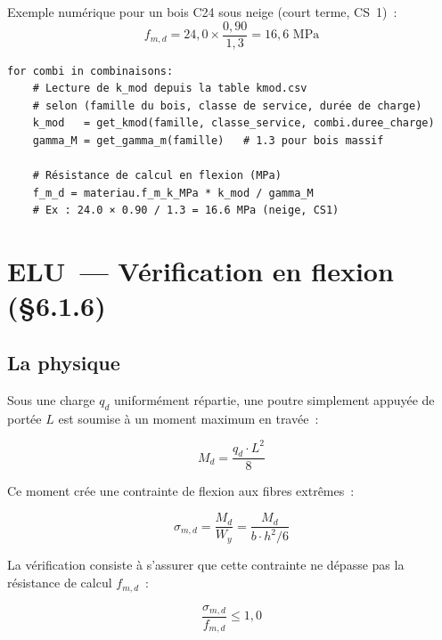 \documentclass[12pt, a4paper, openany]{book}
\newcommand{\fichier}[1]{\texttt{\textit{#1}}}
\begin{document}
Exemple num\'erique pour un bois C24 sous neige (court terme, CS~1)~:
\[
f_{m,d} = 24{,}0 \times \frac{0{,}90}{1{,}3} = 16{,}6 \text{ MPa}
\]

\begin{lstlisting}[style=python, caption={Usage de k\_mod dans \fichier{ec5/elu.py}}]
for combi in combinaisons:
    # Lecture de k_mod depuis la table kmod.csv
    # selon (famille du bois, classe de service, durée de charge)
    k_mod   = get_kmod(famille, classe_service, combi.duree_charge)
    gamma_M = get_gamma_m(famille)   # 1.3 pour bois massif

    # Résistance de calcul en flexion (MPa)
    f_m_d = materiau.f_m_k_MPa * k_mod / gamma_M
    # Ex : 24.0 × 0.90 / 1.3 = 16.6 MPa (neige, CS1)
\end{lstlisting}

\section{ELU~--- V\'erification en flexion (\S{}6.1.6)}

\subsection{La physique}

Sous une charge $q_d$ uniform\'ement r\'epartie, une poutre simplement
appuy\'ee de port\'ee $L$ est soumise \`a un moment maximum en trav\'ee~:

\begin{equation}
M_{d} = \frac{q_d \cdot L^2}{8}
\label{eq:moment}
\end{equation}

Ce moment cr\'ee une contrainte de flexion aux fibres extr\^emes~:

\begin{equation}
\sigma_{m,d} = \frac{M_d}{W_y} = \frac{M_d}{b \cdot h^2 / 6}
\label{eq:sigma}
\end{equation}

La v\'erification consiste \`a s'assurer que cette contrainte ne d\'epasse
pas la r\'esistance de calcul $f_{m,d}$~:

\begin{equation}
\frac{\sigma_{m,d}}{f_{m,d}} \leq 1{,}0
\label{eq:taux_flex}
\end{equation}
\end{document}
